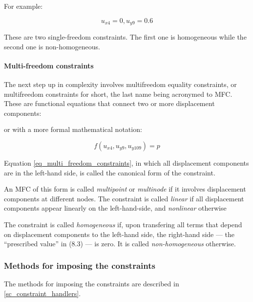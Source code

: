 \begin{center}
\end{center}

\noindent For example:

\begin{equation}
  u_{x4}= 0, u_{y9}= 0.6
\end{equation}

\noindent These are two single-freedom constraints. The first one is homogeneous while the second one is non-homogeneous.

\paragraph{Multi-freedom constraints}
The next step up in complexity involves multifreedom equality constraints, or multifreedom constraints for short,  the last name being acronymed to MFC. These are functional equations that connect two or more displacement components:

\begin{center}
\end{center}

\noindent or with a more formal mathematical notation:

\begin{equation}\label{eq_multi_freedom_constraints}
f(u_{x4}, u_{y9}, u_{y109})= p
\end{equation}

Equation \ref{eq_multi_freedom_constraints}, in which all displacement components are in the left-hand side, is called the canonical form of the constraint.

An MFC of this form is called \emph{multipoint} or \emph{multinode} if it involves displacement components at different nodes.  The constraint is called \emph{linear} if all displacement components appear linearly on the left-hand-side, and \emph{nonlinear} otherwise

The constraint is called \emph{homogeneous} if, upon transfering all terms that depend on displacement components to the left-hand side, the right-hand side — the ``prescribed value'' in (8.3) — is zero. It is called \emph{non-homogeneous} otherwise.

\subsubsection{Methods for imposing the constraints}
The methods for imposing the constraints are described in \ref{sc_constraint_handlers}.





